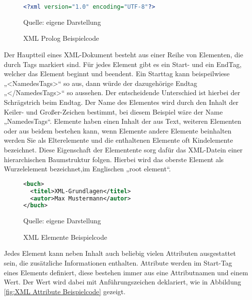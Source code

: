 \begin{figure}[H]
\centering
\begin{minipage}{0.95\textwidth}
\begin{lstlisting}[language=XML]
<?xml version="1.0" encoding="UTF-8"?>
\end{lstlisting}
\end{minipage}
\caption{XML Prolog Beispielcode}
\label{fig:XML Prolog Beispielcode}
    {Quelle: eigene Darstellung}
\end{figure}


Der Hauptteil eines \ac{XML}-Dokument besteht aus einer Reihe von Elementen, die durch Tags markiert sind.
Für jedes Element gibt es ein Start- und ein EndTag, welcher das Element beginnt und beendent.
Ein Starttag kann beispeilwiese „<NamedesTags>“ so aus, dann würde der dazugehörige Endtag „</NamedesTags>“ so aussehen.
Der entscheidende Unterschied ist hierbei der Schrägstrich beim Endtag.
Der Name des Elementes wird durch den Inhalt der Keiler- und Großer-Zeichen bestimmt, bei diesem Beispiel wäre der Name „NamedesTags“.
Elemente haben einen Inhalt der aus Text, weiteren Elementen oder aus beidem bestehen kann,
wenn Elemente andere Elemente beinhalten werden Sie als Elterelemente und die enthaltenen Elemente oft Kindelemente bezeichnet.
Diese Eigenschaft der Elementente sorg dafür das XML-Datein einer hierarchischen Baumstruktur folgen.
Hierbei wird das oberste Element als Wurzelelement bezeichnet,im Englischen „root element“.\cite*[10-14]{Becher2022}


\begin{figure}[H]
\centering
\begin{minipage}{0.95\textwidth}
\begin{lstlisting}[language=XML]
<buch>
  <titel>XML-Grundlagen</titel>
  <autor>Max Mustermann</autor>
</buch>
\end{lstlisting}
\end{minipage}
\caption{XML Elemente Beispielcode}
\label{fig:XML Elemente Beispielcode}
    {Quelle: eigene Darstellung}
\end{figure}

Jedes Element kann neben Inhalt auch beliebig vielen Attributen ausgestattet sein, die zusätzliche Informationen enthalten.
Attribute werden im Start-Tag eines Elements definiert, diese bestehen immer aus eine Attributnamen und einem Wert.
Der Wert wird dabei mit Anführungszeichen deklariert, wie in Abbildung \ref{fig:XML Attribute Beispielcode} gezeigt. \cite*[10-14]{Becher2022}

